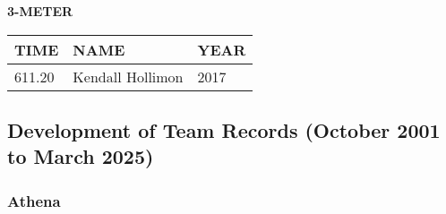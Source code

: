 \begin{table}[H]
\centering
\begin{minipage}[t]{0.6\textwidth}
\centering
\textbf{3-METER}\\[0.1cm]
\begin{tabular}{@{}p{1.8cm}p{2.8cm}p{1.2cm}@{}}
\hline
    \textbf{TIME} & \textbf{NAME} & \textbf{YEAR} \\
\hline
    611.20 & Kendall Hollimon & 2017 \\
\hline
\end{tabular}
\end{minipage}
\end{table}


\newpage

\subsection{Development of Team Records (October 2001 to March 2025)}
\subsubsection{Athena}

